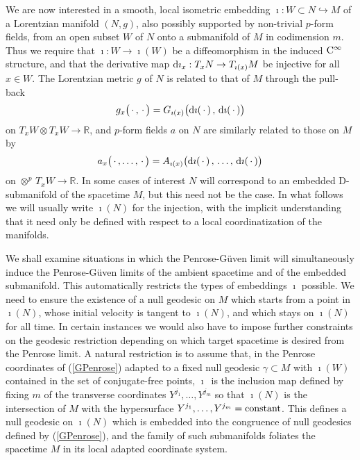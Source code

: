 \documentclass[11pt,a4paper]{article}
\def\dd{{\rm d}}
\newcommand{\real}{{\mathbb R}} %
\newcommand{\beq}{\begin{eqnarray}}
\newcommand{\eeq}{\end{eqnarray}}
\begin{document}
We are now interested in a smooth, local isometric embedding
$\imath:W\subset N\hookrightarrow M$ of a Lorentzian manifold $(N,g)$, also
possibly supported by non-trivial $p$-form fields, from an open subset
$W$ of $N$ onto a submanifold of $M$ in codimension $m$. Thus we require that
$\imath:W\to\imath(W)$ be a diffeomorphism in the induced ${\rm C}^\infty$
structure, and that the derivative map $\dd\imath_x:T_xN\to
T_{\imath(x)}M$ be injective for all $x\in W$. The Lorentzian metric
$g$ of $N$ is related to that of $M$ through the pull-back
\beq
g_x\bigl(\,\cdot\,,\,\cdot\,\bigr)=G_{\imath(x)}\bigl(\dd\imath(\,
\cdot\,)\,,\,\dd\imath(\,\cdot\,)\bigr)
\label{gNpullback}\eeq
on $T_xW\otimes T_xW\to\real$, and $p$-form fields $a$ on $N$ are similarly
related to those on $M$ by
\beq
a_x\bigl(\,\cdot\,,\ldots,\,\cdot\,\bigr)=A_{\imath(x)}
\bigl(\dd\imath(\,\cdot\,)\,,\,\ldots,\,\dd\imath(\,\cdot\,)\bigr)
\label{aNpullback}\eeq
on $\otimes^p\,T_xW\to\real$. In some cases of interest $N$ will correspond to
an embedded D-submanifold of the spacetime $M$, but this need not be
the case. In what follows we will usually write $\imath(N)$ for the
injection, with the implicit understanding that it need only be
defined with respect to a local coordinatization of the manifolds.

We shall examine situations in which the Penrose-G\"uven limit will
simultaneously induce the Penrose-G\"uven limits of the ambient spacetime and
of the embedded submanifold. This automatically restricts the types of
embeddings $\imath$ possible. We need to ensure the existence of a
null geodesic on $M$ which starts from a point in $\imath(N)$, whose
initial velocity is tangent to $\imath(N)$, and
which stays on $\imath(N)$ for all time. In certain instances we would
also have to impose further constraints on the geodesic restriction
depending on which target spacetime is desired from the Penrose
limit. A natural restriction is to assume that, in the Penrose
coordinates of (\ref{GPenrose}) adapted to a fixed null geodesic
$\gamma\subset M$ with $\imath(W)$ contained in the set of
conjugate-free points, $\imath$~is the inclusion map defined by fixing
$m$ of the transverse coordinates $Y^{j_1},\dots,Y^{j_m}$ so that
$\imath(N)$ is the intersection of $M$ with the
hypersurface $Y^{j_1},\dots,Y^{j_m}={\rm constant}$. This defines a
null geodesic on $\imath(N)$ which is embedded into the congruence
of null geodesics defined by (\ref{GPenrose}), and the family of such submanifolds
foliates the spacetime $M$ in its local adapted coordinate system.
\end{document}
